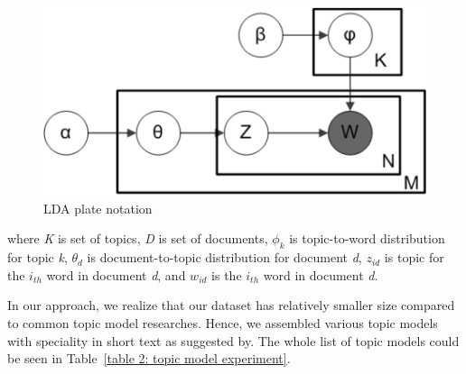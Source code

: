 \documentclass[conference]{IEEEtran}
\begin{document}
\begin{figure}[h]
	\includegraphics[scale=0.5]{lda.png}
	\caption{LDA plate notation}
\label{fig_lda}
\end{figure}

\noindent where {\it K} is set of topics, {\it D} is set of documents, $\phi_k$ is topic-to-word distribution for topic {\it k}, $\theta_d$ is document-to-topic distribution for document {\it d}, $z_{id}$ is topic for the $i_{th}$ word in document {\it d}, and $w_{id}$ is the $i_{th}$ word in document {\it d}.

In our approach, we realize that our dataset has relatively smaller size compared to common topic model researches. Hence, we assembled various topic models with speciality in short text as suggested by\cite{b6}. The whole list of topic models could be seen in Table~\ref{table 2: topic model experiment}.

\begin{table}[b]
\caption{Topic Model Experiment}
\label{table 2: topic model experiment}
\end{table}
\end{document}
